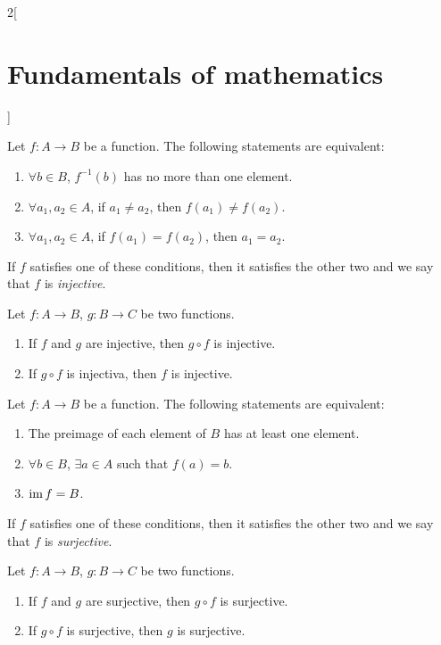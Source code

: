 \documentclass[../../../main.tex]{subfiles}
\begin{document}
\begin{multicols}{2}[\section{Fundamentals of mathematics}]
    \begin{definition}
        Let $f:A\rightarrow B$ be a function. The following statements are equivalent:
        \begin{enumerate}
            \item $\forall b\in B$, $f^{-1}(b)$ has no more than one element.
            \item $\forall a_1,a_2\in A$, if $a_1\ne a_2$, then $f(a_1)\ne f(a_2)$.
            \item $\forall a_1,a_2\in A$, if $f(a_1)= f(a_2)$, then $a_1=a_2$.
        \end{enumerate}
        If $f$ satisfies one of these conditions, then it satisfies the other two and we say that $f$ is \textit{injective}.
    \end{definition}
    \begin{prop}
        Let $f:A\rightarrow B$, $g:B\rightarrow C$ be two functions.
        \begin{enumerate}
            \item If $f$ and $g$ are injective, then $g\circ f$ is injective.
            \item If $g\circ f$ is injectiva, then $f$ is injective.
        \end{enumerate}
    \end{prop}
    \begin{definition}
        Let $f:A\rightarrow B$ be a function. The following statements are equivalent:
        \begin{enumerate}
            \item The preimage of each element of $B$ has at least one element.
            \item $\forall b\in B$, $\exists a\in A$ such that $f(a)=b$.
            \item $\operatorname{im} f=B$.
        \end{enumerate}
        If $f$ satisfies one of these conditions, then it satisfies the other two and we say that $f$ is \textit{surjective}.
    \end{definition}
    \begin{prop}
        Let $f:A\rightarrow B$, $g:B\rightarrow C$ be two functions.
        \begin{enumerate}
            \item If $f$ and $g$ are surjective, then $g\circ f$ is surjective.
            \item If $g\circ f$ is surjective, then $g$ is surjective.
        \end{enumerate}

\end{prop}
\end{multicols}
\end{document}

